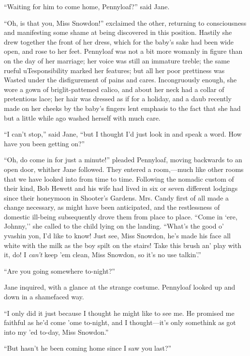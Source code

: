 ``Waiting for him to come home, Pennyloaf?'' said Jane.

``Oh, is that you, Miss Snowdon!'' exclaimed the other, returning to
consciousness and manifesting some shame at being discovered in this
position. Hastily she drew together the front of her dress, which for
the baby's sake had been wide open, and rose to her feet. Pennyloaf was
not a bit more womanly in figure than on the day of her marriage; her
voice was still an immature treble; the same rueful uTesponsibility
marked her features; but all her poor prettiness was {}Wasted under the
disfigurement of pains and cares. Incongruously enough, she wore a gown
of briglit-pattemed calico, and about her neck had a collar of
pretentious lace; her hair was dressed as if for a holiday, and a daub
recently made on her cheeks by the baby's fingers lent emphasis to the
fact that she had but a little while ago washed herself with much care.

``I can't stop,'' said Jane, ``but I thought I'd just look in and speak
a word. How have you been getting on?''

``Oh, do come in for just a minute!'' pleaded Pennyloaf, moving
backwards to an open door, whither Jane followed. They entered a
room,---much like other rooms that we have looked into from time to
time. Following the nomadic custom of their kind, Bob Hewett and his
wife had lived in six or seven different lodgings since their honeymoon
in Shooter's Gardens. Mrs. Candy first of all made a change necessary,
as might have been anticipated, and the restlessness of domestic
ill-being subsequently drove them {}from place to place. ``Come in `ere,
Johnny,'' she called to the child lying on the landing. ``What's the
good o' yvashin yon, I'd like to know! Just see, Miss Snowdon, he's made
his face all white with the milk as the boy spilt on the stairs! Take
this brush an' play with it, do! I \emph{can't} keep 'em clean, Miss
Snowdon, so it's no use talkin'.''

``Are you going somewhere to-night?''

Jane inquired, with a glance at the strange costume. Pennyloaf looked up
and down in a shamefaced way.

``I only did it just because I thought he might like to see me. He
promised me faithful as he'd come 'ome to-night, and I thought---it's
only somethink as got into my 'ed to-day, Miss Snowdon.''

``But hasn't he been coming home since I saw you last?''

